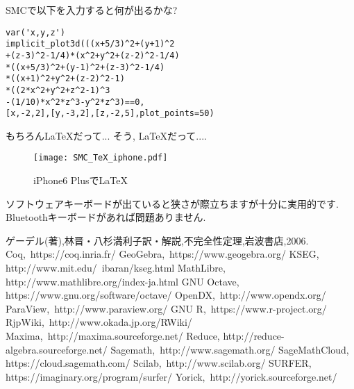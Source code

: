 \documentclass[b5j,8pt,twocolumn]{ltjsarticle}
\begin{document}
SMCで以下を入力すると何が出るかな?

\begin{lstlisting}[caption=みんなで入れようクマー,
frame=tlRB,numberstyle=\footnotesize,basicstyle=\footnotesize]
var('x,y,z')
implicit_plot3d(((x+5/3)^2+(y+1)^2
+(z-3)^2-1/4)*(x^2+y^2+(z-2)^2-1/4)
*((x+5/3)^2+(y-1)^2+(z-3)^2-1/4)
*((x+1)^2+y^2+(z-2)^2-1)
*((2*x^2+y^2+z^2-1)^3
-(1/10)*x^2*z^3-y^2*z^3)==0, 
[x,-2,2],[y,-3,2],[z,-2,5],plot_points=50)
\end{lstlisting}

もちろん{\LaTeX}だって... そう, {\LaTeX}だって....
\newline

\begin{figure}[htbp]
\begin{center}
\texttt{[image: SMC\_TeX\_iphone.pdf]}
\caption{iPhone6 Plusで{\LaTeX}}
\label{fig:smctex}
\end{center}
\end{figure}

ソフトウェアキーボードが出ていると狭さが際立ちますが十分に実用的です.
 Bluetoothキーボードがあれば問題ありません. 

\begin{thebibliography}{99}
ゲーデル(著),林晋・八杉満利子訳・解説,不完全性定理,岩波書店,2006.
Coq,~https://coq.inria.fr/
GeoGebra,~https://www.geogebra.org/
KSEG,
\newline
http://www.mit.edu/~ibaran/kseg.html
MathLibre,
\newline
http://www.mathlibre.org/index-ja.html
GNU Octave,
\newline
https://www.gnu.org/software/octave/
OpenDX,~http://www.opendx.org/
ParaView,~http://www.paraview.org/
GNU R,~https://www.r-project.org/
RjpWiki,~http://www.okada.jp.org/RWiki/
Maxima,~http://maxima.sourceforge.net/
Reduce,\newline
http://reduce-algebra.sourceforge.net/
Sagemath,~http://www.sagemath.org/
SageMathCloud,\newline
https://cloud.sagemath.com/
Scilab,~http://www.scilab.org/
SURFER,\newline
https://imaginary.org/program/surfer/
Yorick,~http://yorick.sourceforge.net/
\end{thebibliography}
\end{document}
